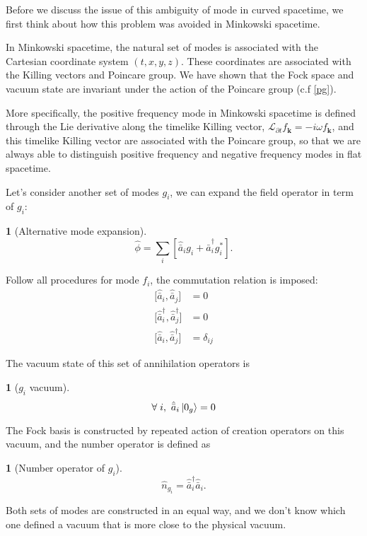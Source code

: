 \documentclass[12pt]{article}
\numberwithin{equation}{section}
\theoremstyle{1style}
\newtheorem{cthm}[equation]{}
\newcommand{\p}{\partial}
\begin{document}
Before we discuss the issue of this ambiguity of mode in curved spacetime,
we first think about how this problem was avoided in Minkowski spacetime.

In Minkowski spacetime, the natural set of modes is associated with the Cartesian coordinate system \((t,x,y,z)\).
These coordinates are associated with the Killing vectors and Poincare group.
We have shown that the Fock space and vacuum state are invariant under the action of the Poincare group (c.f \ref{pg}).

More specifically, the positive frequency mode in Minkowski spacetime is defined through the Lie derivative along the
timelike Killing vector, \(\mathcal{L}_{\p t}f_{\mathbf{k}}=-i\omega f_{\mathbf{k}}\), and this timelike Killing vector
are associated with the Poincare group, so that we are always able to distinguish positive frequency and negative frequency modes in
flat spacetime.

Let's consider another set of modes \(g_i\), we can expand the field operator in term of \(g_i\):
\begin{cthm}[Alternative mode expansion]\label{ame}
  \[\hat{\phi}=\sum_i\left[\hat{\bar{a}}_i g_i+\hat{\bar{a}}_i^\dagger g_i^*\right].\]
\end{cthm}
Follow all procedures for mode \(f_i\), the commutation relation is imposed:
\begin{align}
  \bigl[\hat{\bar{a}}_{i},\hat{\bar{a}}_{j}\bigr]                     & =0           \\
  \bigl[\hat{\bar{a}}^{\dagger}_{i},\hat{\bar{a}}^{\dagger}_{j}\bigr] & =0           \\
  \bigl[\hat{\bar{a}}_{i},\hat{\bar{a}}^{\dagger}_{j}\bigr]           & =\delta_{ij}
\end{align}

The vacuum state of this set of annihilation operators is
\begin{cthm}[\(g_i\) vacuum]
  \[\forall\;i,\ \hat{\bar{a}}_i\ket{0_g}=0\]
\end{cthm}
The Fock basis is constructed by repeated action of creation operators on this vacuum, and the number operator is defined as
\begin{cthm}[Number operator of \(g_i\)]
  \[\hat{n}_{g_i}=\hat{\bar{a}}_i^\dagger \hat{\bar{a}}_i.\]
\end{cthm}

Both sets of modes are constructed in an equal way, and we don't know which one defined a vacuum that is more close to the physical vacuum.
\end{document}
